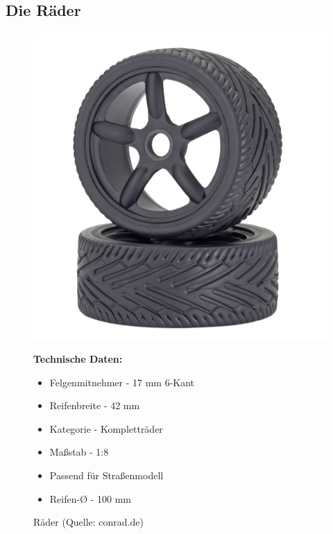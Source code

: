 \subsection{Die Räder}

\begin{figure}[htb]
	\centering
	\begin{minipage}{0.49\linewidth}
		\centering
		\includegraphics[scale=0.5]{images/reifen.png}
		\caption{Räder \newline (Quelle: conrad.de)}
	\end{minipage}
	\begin{minipage}{0.4\linewidth}
		\textbf{Technische Daten:} 
		\begin{itemize} 
			\item Felgenmitnehmer - 17 mm 6-Kant
			\item Reifenbreite - 42 mm
			\item Kategorie - Kompletträder
			\item Maßstab - 1:8 
			\item Passend für Straßenmodell
			\item Reifen-Ø - 100 mm
		\end{itemize}
	\end{minipage}
\end{figure}
\pagebreak

